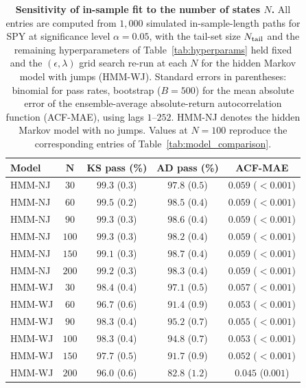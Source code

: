 \begin{table}[tbp]
\centering
\caption{\textbf{Sensitivity of in-sample fit to the number of
    states $N$.} All entries are computed from $1{,}000$ simulated
    in-sample-length paths for SPY at significance level
    $\alpha = 0.05$, with the tail-set size $N_{\rm tail}$ and the
    remaining hyperparameters of Table~\ref{tab:hyperparams} held
    fixed and the $(\epsilon, \lambda)$ grid search re-run at each
    $N$ for the hidden Markov model with jumps (HMM-WJ). Standard
    errors in parentheses: binomial for pass rates, bootstrap
    ($B = 500$) for the mean absolute error of the ensemble-average
    absolute-return autocorrelation function (ACF-MAE), using lags $1$--$252$. HMM-NJ denotes the hidden
    Markov model with no jumps. Values at $N = 100$ reproduce the
    corresponding entries of Table~\ref{tab:model_comparison}.}
\label{tab:sensitivity_n}
\small
\begin{tabular}{@{}lcccc@{}}
\toprule
\textbf{Model} & $\boldsymbol{N}$ & \textbf{KS pass (\%)} &
  \textbf{AD pass (\%)} & \textbf{ACF-MAE} \\ \midrule
HMM-NJ & $30$  & $99.3$ ($0.3$) & $97.8$ ($0.5$) & $0.059$ ($<\!0.001$) \\
HMM-NJ & $60$  & $99.5$ ($0.2$) & $98.5$ ($0.4$) & $0.059$ ($<\!0.001$) \\
HMM-NJ & $90$  & $99.3$ ($0.3$) & $98.6$ ($0.4$) & $0.059$ ($<\!0.001$) \\
HMM-NJ & $100$ & $99.3$ ($0.3$) & $98.2$ ($0.4$) & $0.059$ ($<\!0.001$) \\
HMM-NJ & $150$ & $99.1$ ($0.3$) & $98.7$ ($0.4$) & $0.059$ ($<\!0.001$) \\
HMM-NJ & $200$ & $99.2$ ($0.3$) & $98.3$ ($0.4$) & $0.059$ ($<\!0.001$) \\ \midrule
HMM-WJ & $30$  & $98.4$ ($0.4$) & $97.1$ ($0.5$) & $0.057$ ($<\!0.001$) \\
HMM-WJ & $60$  & $96.7$ ($0.6$) & $91.4$ ($0.9$) & $0.053$ ($<\!0.001$) \\
HMM-WJ & $90$  & $98.3$ ($0.4$) & $95.2$ ($0.7$) & $0.055$ ($<\!0.001$) \\
HMM-WJ & $100$ & $98.3$ ($0.4$) & $94.8$ ($0.7$) & $0.053$ ($<\!0.001$) \\
HMM-WJ & $150$ & $97.7$ ($0.5$) & $91.7$ ($0.9$) & $0.052$ ($<\!0.001$) \\
HMM-WJ & $200$ & $96.0$ ($0.6$) & $82.8$ ($1.2$) & $0.045$ ($0.001$) \\
\bottomrule
\end{tabular}
\end{table}


